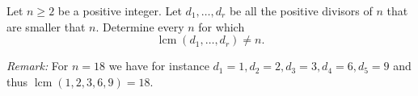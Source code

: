Let $n\geq 2$ be a positive integer.
Let $d_1, \ldots, d_r$ be all the positive divisors of $n$ that are smaller that $n$.
Determine every $n$ for which
$$\operatorname{lcm}(d_1, \ldots, d_r) \neq n.$$

\emph{Remark:} For $n=18$ we have for instance $d_1 = 1, d_2 = 2, d_3 = 3, d_4 = 6, d_5=9$ and
thus $\operatorname{lcm}(1,2,3,6,9) = 18$.
